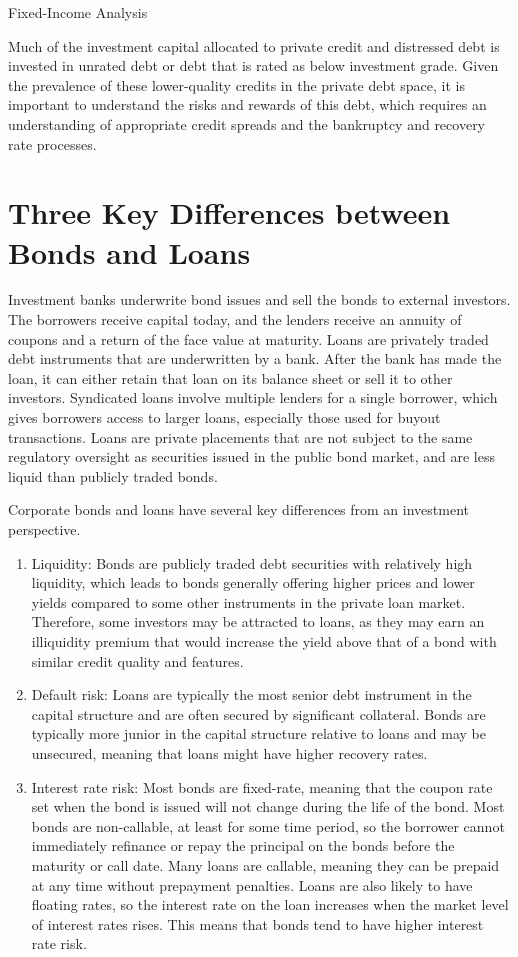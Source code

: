 \documentclass[11pt]{article}
\begin{document}
Fixed-Income Analysis

Much of the investment capital allocated to private credit and distressed debt is invested in unrated debt or debt that is rated as below investment grade. Given the prevalence of these lower-quality credits in the private debt space, it is important to understand the risks and rewards of this debt, which requires an understanding of appropriate credit spreads and the bankruptcy and recovery rate processes.

\section*{Three Key Differences between Bonds and Loans}
Investment banks underwrite bond issues and sell the bonds to external investors. The borrowers receive capital today, and the lenders receive an annuity of coupons and a return of the face value at maturity. Loans are privately traded debt instruments that are underwritten by a bank. After the bank has made the loan, it can either retain that loan on its balance sheet or sell it to other investors. Syndicated loans involve multiple lenders for a single borrower, which gives borrowers access to larger loans, especially those used for buyout transactions. Loans are private placements that are not subject to the same regulatory oversight as securities issued in the public bond market, and are less liquid than publicly traded bonds.

Corporate bonds and loans have several key differences from an investment perspective.

\begin{enumerate}
  \item Liquidity: Bonds are publicly traded debt securities with relatively high liquidity, which leads to bonds generally offering higher prices and lower yields compared to some other instruments in the private loan market. Therefore, some investors may be attracted to loans, as they may earn an illiquidity premium that would increase the yield above that of a bond with similar credit quality and features.

  \item Default risk: Loans are typically the most senior debt instrument in the capital structure and are often secured by significant collateral. Bonds are typically more junior in the capital structure relative to loans and may be unsecured, meaning that loans might have higher recovery rates.

  \item Interest rate risk: Most bonds are fixed-rate, meaning that the coupon rate set when the bond is issued will not change during the life of the bond. Most bonds are non-callable, at least for some time period, so the borrower cannot immediately refinance or repay the principal on the bonds before the maturity or call date. Many loans are callable, meaning they can be prepaid at any time without prepayment penalties. Loans are also likely to have floating rates, so the interest rate on the loan increases when the market level of interest rates rises. This means that bonds tend to have higher interest rate risk.

\end{enumerate}
\end{document}
